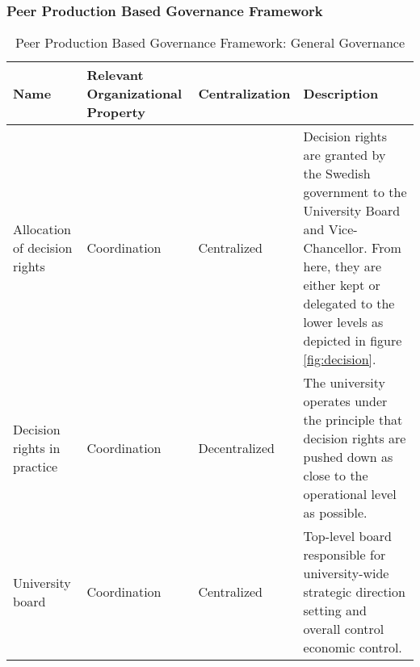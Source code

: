 
\subsubsection{Peer Production Based Governance Framework}

\begin{table}
\caption{Peer Production Based Governance Framework: General Governance}
\label{table:peerGeneralGovernance}
\begin{tabular}{ | p{} | p{}| p{} | p{}|}
%
\hline
%
\textbf{Name} & 
\textbf{Relevant Organizational Property} &
\textbf{Centralization} &  
\textbf{Description} \\
%
\hline
%
 Allocation of decision rights & 
 Coordination &
 Centralized & 
 Decision rights are granted by the Swedish government to the University Board and Vice-Chancellor. From here, they are either kept or delegated to the lower levels as depicted in figure \ref{fig:decision}. \\
%
\hline
%
 Decision rights in practice & 
 Coordination &
 Decentralized & 
 The university operates under the principle that decision rights are pushed down as close to the operational level as possible. \\
%
\hline
%
%
%
 University board &
 Coordination &
 Centralized &
 Top-level board responsible for university-wide strategic direction setting and overall control economic control. \\
%
\hline
%
 

\end{tabular}
\end{table}
